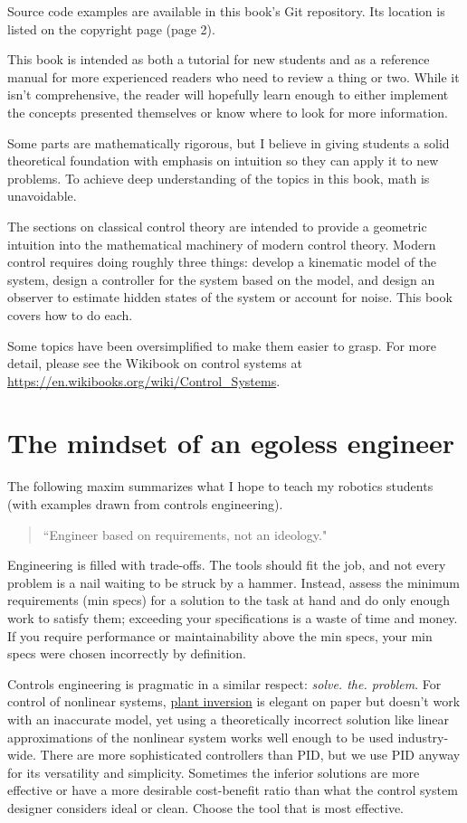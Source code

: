Source code examples are available in this book's Git repository. Its location
is listed on the copyright page (page 2).

This book is intended as both a tutorial for new students and as a reference
manual for more experienced readers who need to review a thing or two. While it
isn't comprehensive, the reader will hopefully learn enough to either implement
the concepts presented themselves or know where to look for more information.

Some parts are mathematically rigorous, but I believe in giving students a solid
theoretical foundation with emphasis on intuition so they can apply it to new
problems. To achieve deep understanding of the topics in this book, math is
unavoidable.

The sections on classical control theory are intended to provide a geometric
intuition into the mathematical machinery of modern control theory. Modern
control requires doing roughly three things: develop a kinematic model of the
system, design a controller for the system based on the model, and design an
observer to estimate hidden states of the system or account for noise. This book
covers how to do each.

Some topics have been oversimplified to make them easier to grasp. For more
detail, please see the Wikibook on control systems at
\url{https://en.wikibooks.org/wiki/Control_Systems}.

\section{The mindset of an egoless engineer}

The following maxim summarizes what I hope to teach my robotics students (with
examples drawn from controls engineering).

\begin{quote}
  ``Engineer based on requirements, not an ideology."
\end{quote}

Engineering is filled with trade-offs. The tools should fit the job, and not
every problem is a nail waiting to be struck by a hammer. Instead, assess the
minimum requirements (min specs) for a solution to the task at hand and do only
enough work to satisfy them; exceeding your specifications is a waste of time
and money. If you require performance or maintainability above the min specs,
your min specs were chosen incorrectly by definition.

Controls engineering is pragmatic in a similar respect:
\textit{solve. the. problem}. For control of nonlinear systems,
\href{https://faculty.washington.edu/devasia/Inversion.html}{plant inversion}
is elegant on paper but doesn't work with an inaccurate model, yet using a
theoretically incorrect solution like linear approximations of the nonlinear
system works well enough to be used industry-wide. There are more sophisticated
controllers than PID, but we use PID anyway for its versatility and simplicity.
Sometimes the inferior solutions are more effective or have a more desirable
cost-benefit ratio than what the control system designer considers ideal or
clean. Choose the tool that is most effective.


